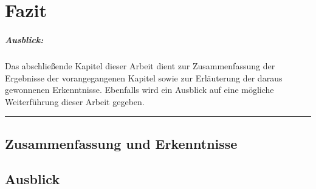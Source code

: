 
\chapter{Fazit}

\paragraph{Ausblick:}
Das abschließende Kapitel dieser Arbeit dient zur Zusammenfassung der Ergebnisse der vorangegangenen Kapitel sowie zur Erläuterung der daraus gewonnenen Erkenntnisse. Ebenfalls wird ein Ausblick auf eine mögliche Weiterführung dieser Arbeit gegeben.
\\
\hrule

\section{Zusammenfassung und Erkenntnisse}

\section{Ausblick}

\cleardoublepage